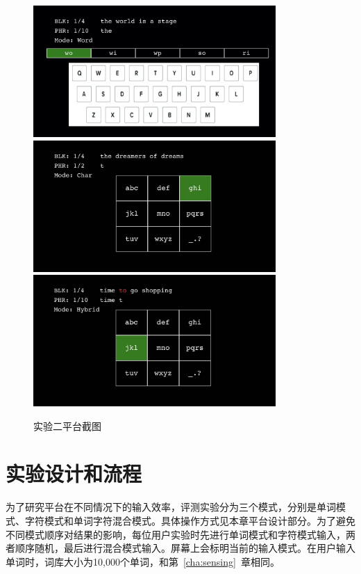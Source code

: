 \begin{figure}[h]
  \centering%
    {\includegraphics[height=5cm]{figures/platform11.jpg}}%
  \hspace{4em}%
      {\includegraphics[height=5cm]{figures/platform12.jpg}}
  \hspace{4em}%
      {\includegraphics[height=5cm]{figures/platform13.jpg}}
  \caption{实验二平台截图}
  \label{fig:platform1}
\end{figure}



\section{实验设计和流程}
为了研究平台在不同情况下的输入效率，评测实验分为三个模式，分别是单词模式、字符模式和单词字符混合模式。具体操作方式见本章平台设计部分。为了避免不同模式顺序对结果的影响，每位用户实验时先进行单词模式和字符模式输入，两者顺序随机，最后进行混合模式输入。屏幕上会标明当前的输入模式。在用户输入单词时，词库大小为10,000个单词，和第~\ref{cha:sensing}~章相同。

